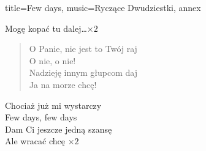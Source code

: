 \begin{song}{title={Few days}, music={Ryczące Dwudziestki}, annex}
\begin{multicols}{2}
\begin{chorus}
        Mogę kopać tu dalej\ldots $\times 2$
    \end{chorus}
    \begin{verse}
        O Panie, nie jest to Twój raj \\
        O nie, o nie! \\
        Nadzieję innym głupcom daj \\
        Ja na morze chcę!
    \end{verse}
    \begin{chorus}
        Chociaż już mi wystarczy \\
        Few days, few days \\
        Dam Ci jeszcze jedną szansę \\
        Ale wracać chcę $\times 2$
    \end{chorus}
    \end{multicols}
\end{song}

